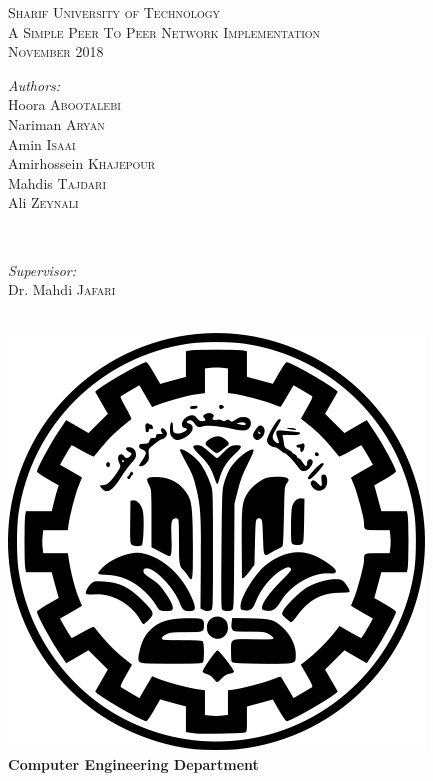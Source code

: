 \documentclass{article}
\begin{document}
\begin{titlepage}
\begin{center}
\textsc{\LARGE Sharif University of Technology}\\[1.5cm]
\textsc{\Large A Simple Peer To Peer Network Implementation}\\[0.5cm]
\textsc{\large November 2018}\\

\begin{minipage}{0.4\textwidth}
\begin{flushleft} \large
\emph{Authors:}\\
Hoora  \textsc{Abootalebi}\\
Nariman  \textsc{Aryan}\\
Amin \textsc{Isaai}\\
Amirhossein \textsc{Khajepour}\\
Mahdis \textsc{Tajdari}\\
Ali  \textsc{Zeynali} %
\end{flushleft}
\end{minipage}
~
\begin{minipage}{0.4\textwidth}
\begin{flushright} \large
\emph{Supervisor:} \\
Dr. Mahdi \textsc{Jafari} %
\end{flushright}
\end{minipage}\\[2cm]
\includegraphics[scale=0.15]{sharif-logo.png}\\
\textbf{Computer Engineering Department}
\end{center}
\end{titlepage}
\large
\clearpage
\tableofcontents
\clearpage
\end{document}
